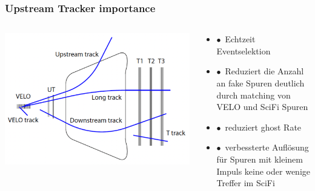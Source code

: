 \documentclass[aspectratio=1610, 12pt, xcolor=dvipsnames]{beamer}
\begin{document}
\begin{frame}\frametitle{Upstream Tracker importance}
  \begin{columns}
    \begin{column}[c]{0.48\textwidth}
      \includegraphics[width=\textwidth]{plots/track_types.png}
    \end{column}
    \begin{column}[c]{0.48\textwidth}
      \begin{itemize}
        \item $\bullet$\, Echtzeit Eventselektion
        \item $\bullet$\, Reduziert die Anzahl an fake Spuren deutlich durch matching von VELO und SciFi Spuren
        \item $\bullet$\, \to reduziert ghost Rate
        \item $\bullet$\, verbessterte Auflösung für Spuren mit kleinem Impuls \to keine oder wenige Treffer im SciFi
      \end{itemize}
    \end{column}
  \end{columns}
\end{frame}
\end{document}
